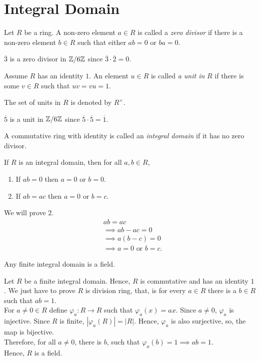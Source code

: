 \section{Integral Domain}
\begin{definition}
    Let $R$ be a ring. A non-zero element $a \in R$ is called a \textit{zero divisor} if there is a non-zero element $b \in R$ such that either $ab = 0$ or $ba = 0$.
\end{definition}
\begin{eg}
    $\overline{3}$ is a zero divisor in $\mathbb{Z}/6\mathbb{Z}$ since $\overline{3} \cdot \overline{2} = 0$.
\end{eg}
\begin{definition}[Unit]
    Assume $R$ has an identity $1$. An element $u \in R$ is called \textit{a unit in} $R$ if there is some $v \in R$ such that $uv = vu = 1$.
\end{definition}
The set of units in $R$ is denoted by $R^{\times}$.
\begin{eg}
    $\overline{5}$ is a unit in $\mathbb{Z}/6\mathbb{Z}$ since $\overline{5} \cdot \overline{5} = \overline{1}$.
\end{eg}
\begin{definition}
    A commutative ring with identity is called an \textit{integral domain} if it has no zero divisor.
\end{definition}
\begin{prop}
    If $R$ is an integral domain, then for all $a,b\in R$,
    \begin{enumerate}
        \item If $ab = 0$ then $a = 0$ or $b = 0$.
        \item If $ab = ac$ then $a = 0$ or $b = c$.
    \end{enumerate}
\end{prop}
\begin{propproof}
    We will prove $2$.
    \begin{align*}
        & ab = ac\\
        &\implies ab - ac = 0\\
        &\implies a(b-c) = 0\\
        &\implies a = 0 \text{ or } b=c.
    \end{align*}
\end{propproof}
\begin{lemma}
    Any finite integral domain is a field.
\end{lemma}
\begin{propproof}
    Let $R$ be a finite integral domain. Hence, $R$ is commutative and has an identity $1$. We just have to prove $R$ is division ring, that, is for every $a \in R$ there is a $b \in R$ such that $ab = 1$.\\
    For $a \neq 0 \in R$ define $\varphi_a:R \rightarrow R$ such that $\varphi_a(x) = ax$.
    Since $a \neq 0$, $\varphi_a$ is injective. Since $R$ is finite, $|\varphi_a(R)| = |R|$. Hence, $\varphi_a$ is also surjective, so, the map is bijective.\\
    Therefore, for all $a \neq 0$, there is $b$, such that $\varphi_a(b) = 1 \implies ab = 1$.\\
    Hence, $R$ is a field. 
\end{propproof}
\newpage
